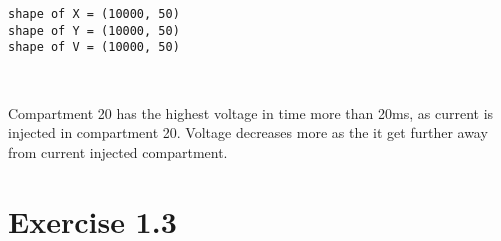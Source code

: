 \documentclass[11pt]{article}
\begin{document}
    \begin{Verbatim}[commandchars=\\\{\}]
shape of X = (10000, 50)
shape of Y = (10000, 50)
shape of V = (10000, 50)

    \end{Verbatim}

    \begin{center}
    \end{center}
    { \hspace*{\fill} \\}
    
    Compartment 20 has the highest voltage in time more than 20ms, as
current is injected in compartment 20. Voltage decreases more as the it
get further away from current injected compartment.

    \hypertarget{exercise-1.3}{%
\section{Exercise 1.3}\label{exercise-1.3}}
\end{document}
